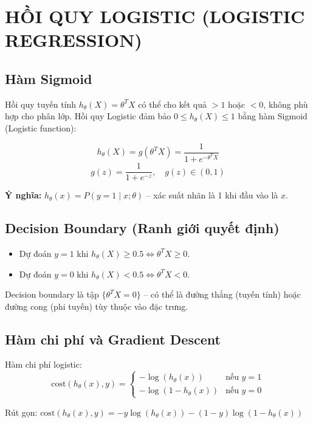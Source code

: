 \documentclass[10pt]{article}
\begin{document}
\section{HỒI QUY LOGISTIC (LOGISTIC REGRESSION)}

\subsection{Hàm Sigmoid}

Hồi quy tuyến tính $h_\theta(X) = \theta^TX$ có thể cho kết quả $> 1$ hoặc $< 0$, không phù hợp cho phân lớp. Hồi quy Logistic đảm bảo $0 \leq h_\theta(X) \leq 1$ bằng hàm Sigmoid (Logistic function):

\[
h_\theta(X) = g(\theta^TX) = \frac{1}{1 + e^{-\theta^TX}}
\]
\[
g(z) = \frac{1}{1 + e^{-z}}, \quad g(z) \in (0, 1)
\]

\textbf{Ý nghĩa:} $h_\theta(x) = P(y=1 \mid x; \theta)$ -- xác suất nhãn là 1 khi đầu vào là $x$.

\subsection{Decision Boundary (Ranh giới quyết định)}

\begin{itemize}
    \item Dự đoán $y = 1$ khi $h_\theta(X) \geq 0.5 \Leftrightarrow \theta^TX \geq 0$.
    \item Dự đoán $y = 0$ khi $h_\theta(X) < 0.5 \Leftrightarrow \theta^TX < 0$.
\end{itemize}

Decision boundary là tập $\{\theta^TX = 0\}$ -- có thể là đường thẳng (tuyến tính) hoặc đường cong (phi tuyến) tùy thuộc vào đặc trưng.

\subsection{Hàm chi phí và Gradient Descent}

Hàm chi phí logistic:
\[
\text{cost}(h_\theta(x), y) = \begin{cases}
-\log(h_\theta(x)) & \text{nếu } y = 1 \\
-\log(1 - h_\theta(x)) & \text{nếu } y = 0
\end{cases}
\]

Rút gọn: $\text{cost}(h_\theta(x), y) = -y\log(h_\theta(x)) - (1-y)\log(1-h_\theta(x))$
\end{document}
